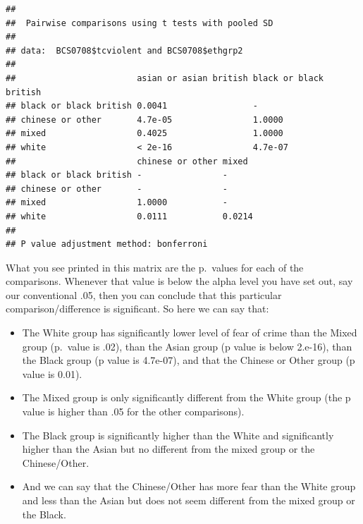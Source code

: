 \documentclass[
]{book}
\newenvironment{Shaded}{\begin{snugshade}}{\end{snugshade}}
\newcommand{\AttributeTok}[1]{\textcolor[rgb]{0.77,0.63,0.00}{#1}}
\newcommand{\FunctionTok}[1]{\textcolor[rgb]{0.00,0.00,0.00}{#1}}
\newcommand{\NormalTok}[1]{#1}
\newcommand{\SpecialCharTok}[1]{\textcolor[rgb]{0.00,0.00,0.00}{#1}}
\newcommand{\StringTok}[1]{\textcolor[rgb]{0.31,0.60,0.02}{#1}}
\begin{document}
\begin{Shaded}
\end{Shaded}

\begin{verbatim}
## 
##  Pairwise comparisons using t tests with pooled SD 
## 
## data:  BCS0708$tcviolent and BCS0708$ethgrp2 
## 
##                        asian or asian british black or black british
## black or black british 0.0041                 -                     
## chinese or other       4.7e-05                1.0000                
## mixed                  0.4025                 1.0000                
## white                  < 2e-16                4.7e-07               
##                        chinese or other mixed 
## black or black british -                -     
## chinese or other       -                -     
## mixed                  1.0000           -     
## white                  0.0111           0.0214
## 
## P value adjustment method: bonferroni
\end{verbatim}

What you see printed in this matrix are the p.~values for each of the comparisons. Whenever that value is below the alpha level you have set out, say our conventional .05, then you can conclude that this particular comparison/difference is significant. So here we can say that:

\begin{itemize}
\item
  The White group has significantly lower level of fear of crime than the Mixed group (p.~value is .02), than the Asian group (p value is below 2.e-16), than the Black group (p value is 4.7e-07), and that the Chinese or Other group (p value is 0.01).
\item
  The Mixed group is only significantly different from the White group (the p value is higher than .05 for the other comparisons).
\item
  The Black group is significantly higher than the White and significantly higher than the Asian but no different from the mixed group or the Chinese/Other.
\item
  And we can say that the Chinese/Other has more fear than the White group and less than the Asian but does not seem different from the mixed group or the Black.
\end{itemize}
\end{document}
